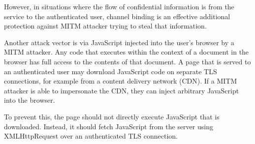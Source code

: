 However, in situations where the flow of confidential information is from the service to the
authenticated user, channel binding is an effective additional protection against MITM attacker
trying to steal that information.

Another attack vector is via JavaScript injected into the user's browser by a MITM attacker. Any
code that executes within the context of a document in the browser has full access to the contents
of that document. A page that is served to an authenticated user may download JavaScript code on
separate TLS connections, for example from a content delivery network (CDN). If a MITM attacker is
able to impersonate the CDN, they can inject arbitrary JavaScript into the browser.

To prevent this, the page should not directly execute JavaScript that is downloaded. Instead, it
should fetch JavaScript from the server using XMLHttpRequest over an authenticated TLS connection. 
